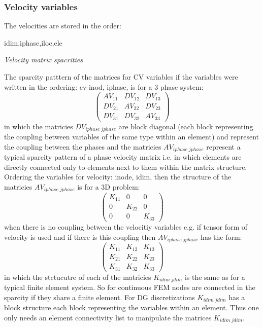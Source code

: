 \subsubsection{Velocity variables} 
The velocities are stored in the order: 
\par\noindent
idim,iphase,iloc,ele


\par\noindent
{\it Velocity matrix spacrities} 

The sparcity patttern of the matrices for CV variables if the variables were written 
in the ordering: cv-inod, iphase, is for a 3 phase system:
\begin{equation}
  \begin{pmatrix}
AV_{11}  &  DV_{12}  &  DV_{13} \\ 
DV_{21}  &  AV_{22}  &  DV_{23} \\
DV_{31}  &  DV_{32}  &  AV_{33} 
  \end{pmatrix}
\label{Vel-mat-spar}
\end{equation}
in which the matricies $DV_{iphase\; jphase}$ are block diagonal (each block representing 
the coupling between variables of the same type within an element) and represent the 
coupling between the phases and the matricies $AV_{iphase\; jphase}$ represent 
a typical sparcity pattern of a phase velocity matrix i.e. in which elements are 
directly connected only to elements next to them within the matrix structure. 
Ordering the variables for velocity: inode, idim, then the structure of the matricies $AV_{iphase\; jphase}$ is 
for a 3D problem:
\begin{equation}
  \begin{pmatrix}
K_{11}  &  0  &  0 \\ 
0 &  K_{22}  &  0 \\
0  &  0  &  K_{33} 
  \end{pmatrix}
\label{Vel-1phase-mat-spar}
\end{equation}
when there is no coupling between the velocitiy variables e.g. if tensor form of velocity is used and 
if there is this coupling then  $AV_{iphase\;jphase}$ has the form: 
\begin{equation}
  \begin{pmatrix}
K_{11}  &  K_{12}  &  K_{13} \\ 
K_{21}  &  K_{22}  &  K_{23} \\ 
K_{31}  &  K_{32}  &  K_{33}  
  \end{pmatrix}
\label{Vel-1phase-stress-mat-spar}
\end{equation}
in which the stctucutre of each of the matricies $K_{idim\; jdim}$ is the same as 
for a typical finite element system. So for continuous FEM nodes are connected in the sparcity 
if they share a finite element. For DG discretizations $K_{idim\; jdim}$ has a block structure 
each block representing the variables within an element. Thus one only needs an element connectivity 
list to manipulate the matrices $K_{idim\; jdim}$. 


